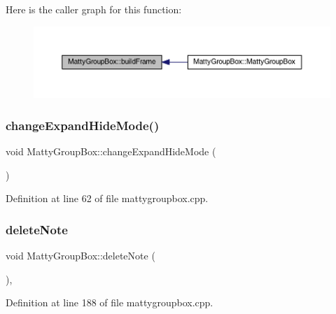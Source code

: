 Here is the caller graph for this function\+:
\nopagebreak
\begin{figure}[H]
\begin{center}
\leavevmode
\includegraphics[width=350pt]{classMattyGroupBox_ae9862aae672bd2cf4a99da541beef696_icgraph}
\end{center}
\end{figure}
\hypertarget{classMattyGroupBox_acb2b6f0d418195c1a9838f4c3565378f}{}\label{classMattyGroupBox_acb2b6f0d418195c1a9838f4c3565378f} 
\subsubsection{\texorpdfstring{change\+Expand\+Hide\+Mode()}{changeExpandHideMode()}}
{\footnotesize\ttfamily void Matty\+Group\+Box\+::change\+Expand\+Hide\+Mode (\begin{DoxyParamCaption}{ }\end{DoxyParamCaption})}



Definition at line 62 of file mattygroupbox.\+cpp.

\hypertarget{classMattyGroupBox_ac7b7f1db6ea96e4c4b0f58fb87f86900}{}\label{classMattyGroupBox_ac7b7f1db6ea96e4c4b0f58fb87f86900} 
\subsubsection{\texorpdfstring{delete\+Note}{deleteNote}}
{\footnotesize\ttfamily void Matty\+Group\+Box\+::delete\+Note (\begin{DoxyParamCaption}{ }\end{DoxyParamCaption})\hspace{0.3cm}{\ttfamily [private]}, {\ttfamily [slot]}}



Definition at line 188 of file mattygroupbox.\+cpp.

